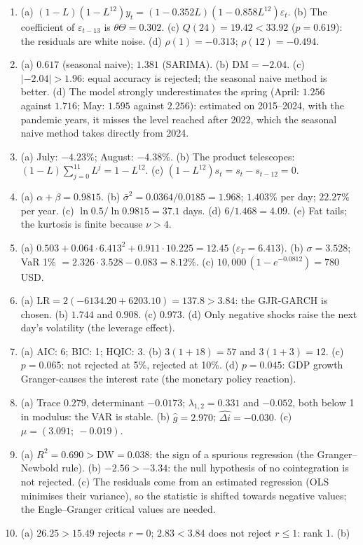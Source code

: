 \documentclass[10.5pt]{article}
\begin{document}
{\begin{enumerate}[label=\textbf{\arabic*.},leftmargin=2.2em,itemsep=0.25ex]
\item (a) $(1-L)(1-L^{12})y_t=(1-0.352L)(1-0.858L^{12})\varepsilon_t$. (b) The coefficient of $\varepsilon_{t-13}$ is $\theta\Theta=0.302$. (c) $Q(24)=19.42<33.92$ ($p=0.619$): the residuals are white noise. (d) $\rho(1)=-0.313$; $\rho(12)=-0.494$.
\item (a) $0.617$ (seasonal naive); $1.381$ (SARIMA). (b) $\mathrm{DM}=-2.04$. (c) $|-2.04|>1.96$: equal accuracy is
rejected; the seasonal naive method is better. (d) The model strongly underestimates the spring (April: $1.256$
against $1.716$; May: $1.595$ against $2.256$): estimated on 2015--2024, with the pandemic years, it misses the level
reached after 2022, which the seasonal naive method takes directly from 2024.
\item (a) July: $-4.23\%$; August: $-4.38\%$. (b) The product telescopes: $(1-L)\sum_{j=0}^{11}L^j=1-L^{12}$.
(c) $(1-L^{12})s_t=s_t-s_{t-12}=0$.
\item (a) $\alpha+\beta=0.9815$. (b) $\bar\sigma^2=0.0364/0.0185=1.968$; $1.403\%$ per day; $22.27\%$ per year. (c) $\ln 0.5/\ln 0.9815=37.1$ days. (d) $6/1.468=4.09$. (e) Fat tails; the kurtosis is finite because $\nu>4$.
\item (a) $0.503+0.064\cdot 6.413^2+0.911\cdot 10.225=12.45$ ($\varepsilon_T=6.413$). (b) $\sigma=3.528$;
VaR 1\% $=2.326\cdot 3.528-0.083=8.12\%$. (c) $10{,}000\,(1-e^{-0.0812})=780$ USD.
\item (a) $\mathrm{LR}=2(-6134.20+6203.10)=137.8>3.84$: the GJR-GARCH is chosen. (b) $1.744$ and $0.908$.
(c) $0.973$. (d) Only negative shocks raise the next day's volatility (the leverage effect).
\item (a) AIC: 6; BIC: 1; HQIC: 3. (b) $3(1+18)=57$ and $3(1+3)=12$. (c) $p=0.065$: not rejected at 5\%, rejected at
10\%. (d) $p=0.045$: GDP growth Granger-causes the interest rate (the monetary policy reaction).
\item (a) Trace $0.279$, determinant $-0.0173$; $\lambda_{1,2}=0.331$ and $-0.052$, both below 1 in modulus: the VAR is
stable. (b) $\hat g=2.970$; $\widehat{\Delta i}=-0.030$. (c) $\mu=(3.091;\ -0.019)$.
\item (a) $R^2=0.690>\mathrm{DW}=0.038$: the sign of a spurious regression (the Granger--Newbold rule). (b)
$-2.56>-3.34$: the null hypothesis of no cointegration is not rejected. (c) The residuals come from an estimated regression (OLS minimises
their variance), so the statistic is shifted towards negative values; the Engle--Granger critical values are needed.
\item (a) $26.25>15.49$ rejects $r=0$; $2.83<3.84$ does not reject $r\le 1$: rank 1. (b)

\end{enumerate}}
\end{document}
